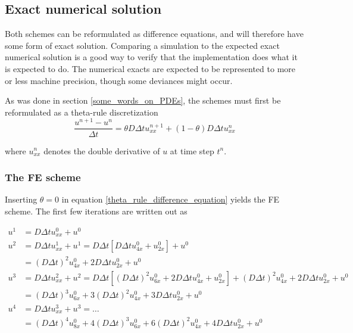 \begin{figure}[H]
 \label{spatial_convergence_test}
\end{figure}


\subsection{Exact numerical solution}\label{exact_numerical_solution}

Both schemes can be reformulated as difference equations, and will therefore have some form of exact solution. 
Comparing a simulation to the expected exact numerical solution is a good way to verify that the implementation does what it is expected to do. 
The numerical exacts are expected to be represented to more or less machine precision, though some deviances might occur.

As was done in section \ref{some_words_on_PDEs}, the schemes must first be reformulated as a theta-rule discretization
\begin{equation}\label{theta_rule_difference_equation}
  \frac{u^{n+1}-u^n}{\Delta t} =\theta D\Delta t u_{xx}^{n+1} +(1-\theta)D\Delta t u_{xx}^n
\end{equation}

where $u_{xx}^n$ denotes the double derivative of $u$ at time step $t^n$.

\subsubsection{The FE scheme}

Inserting $\theta=0$ in equation \eqref{theta_rule_difference_equation} yields the FE scheme. The first few iterations are written out as

\begin{align*}
 u^1 &= D\Delta t u_{xx}^0 + u^0 \\
 u^2 &= D\Delta t u_{xx}^1 + u^1 = D\Delta t\left[D\Delta t u_{4x}^0 + u_{2x}^0\right] + u^0\\
 &= \left(D\Delta t\right)^2 u_{4x}^0 + 2D\Delta t u_{2x}^0+ u^0 \\
 u^3 &= D\Delta t u_{xx}^2 + u^2 = D\Delta t\left[\left(D\Delta t\right)^2 u_{6x}^0 + 2D\Delta t u_{4x}^0+ u_{2x}^0\right] + \left(D\Delta t\right)^2 u_{4x}^0 + 2D\Delta t u_{2x}^0+ u^0\\
 &= \left(D\Delta t\right)^3 u_{6x}^0 + 3\left(D\Delta t\right)^2 u_{4x}^0+ 3D\Delta tu_{2x}^0 + u^0 \\
 u^4 &= D\Delta t u_{xx}^3 + u^3 = \dots \\
 &= \left(D\Delta t\right)^4 u_{8x}^0 + 4\left(D\Delta t\right)^3 u_{6x}^0+ 6\left(D\Delta t\right)^2 u_{4x}^0 + 4D\Delta t u_{2x}^0 + u^0 
\end{align*}

